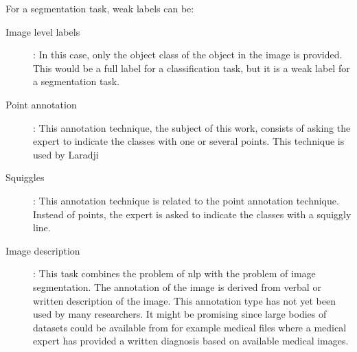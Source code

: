 For a segmentation task, weak labels can be:
\begin{description}
    \item[Image level labels]: In this case, only the object class of the object in the image is provided. 
    This would be a full label for a classification task, but it is a weak label for a segmentation task.
    \item[Point annotation]: This annotation technique, the subject of this work, consists of asking the expert to indicate the classes with one or several points. This technique is used by Laradji
    \item[Squiggles]: This annotation technique is related to the point annotation technique. Instead of points, the expert is asked to indicate the classes with a squiggly line.
    \item[Image description]: This task combines the problem of \acrlong{nlp} with the problem of image segmentation. The annotation of the image is derived from verbal or written description of the image. 
    This annotation type has not yet been used by many researchers. 
    It might be promising since large bodies of datasets could be available from for example medical files where a medical expert has provided a written diagnosis based on available medical images. 
\end{description}

